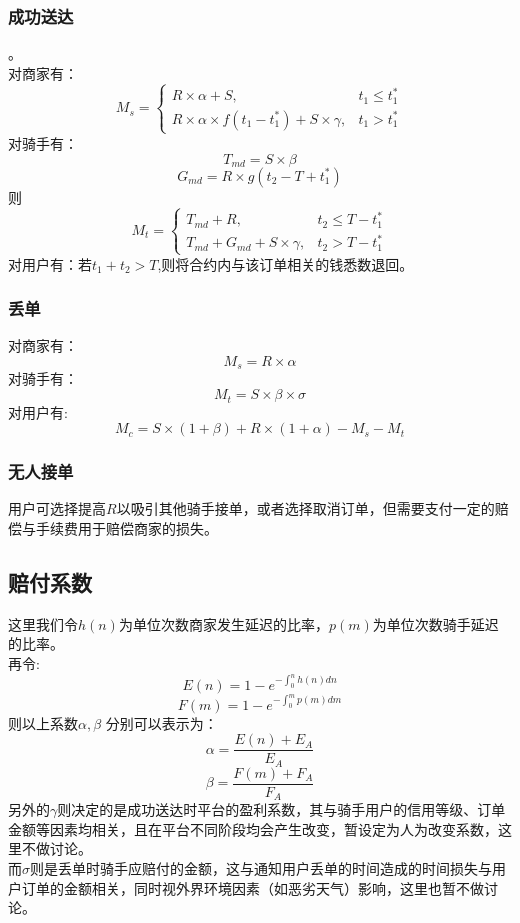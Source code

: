 \documentclass[UTF8]{ctexart}
\begin{document}
\begin{multicols}{2}
  \subsubsection{成功送达}
    。 \\
    \indent 对商家有：
    $$
    M_s=\left\{
      \begin{array}{lr}
        R \times \alpha + S,  & {t_1 \leq t_1^{*}}\\
        R \times \alpha \times f(t_1-t_1^{*}) + S \times \gamma, & {t_1 > t_1^{*}}
      \end{array}\right.
    $$
    \indent 对骑手有：\\
    $$T_{md} = S \times \beta $$
    $$ G_{md}=R \times g(t_2-T+t_1^{*})$$
    \indent 则
    $$
    M_t=\left\{
      \begin{array}{lr}
        T_{md}+R,  & {t_2 \leq T-t_1^{*}}\\
        T_{md} + G_{md} + S \times \gamma, & {t_2 > T -t_1^{*}}
      \end{array}\right.
    $$
    \indent 对用户有：若$t_1+t_2>T$,则将合约内与该订单相关的钱悉数退回。
  \subsubsection{丢单}

  \indent 对商家有：
  $$M_s=R \times \alpha $$
  \indent 对骑手有：
  $$M_t=S \times \beta \times \sigma$$
  \indent 对用户有:
  $$M_c=S \times (1+\beta)+R \times (1+\alpha)-M_s-M_t$$
  \subsubsection{无人接单}
  \indent 用户可选择提高$R$以吸引其他骑手接单，或者选择取消订单，但需要支付一定的赔偿与手续费用于赔偿商家的损失。
  \subsection{赔付系数}
  \indent 这里我们令$h(n)$为单位次数商家发生延迟的比率，$p(m)$为单位次数骑手延迟的比率。\\
  \indent 再令:$$E(n)=1-e^{- \int_{0}^{n}h(n)dn}$$
  $$F(m)=1-e^{- \int_{0}^{m}p(m)dm}$$
  \indent 则以上系数$\alpha, \beta$ 分别可以表示为：
  $$\alpha = \frac{E(n)+E_A}{E_A}$$
  $$\beta = \frac{F(m)+F_A}{F_A}$$
  \indent 另外的$\gamma$则决定的是成功送达时平台的盈利系数，其与骑手用户的信用等级、订单金额等因素均相关，且在平台不同阶段均会产生改变，暂设定为人为改变系数，这里不做讨论。\\
  \indent 而$\sigma$则是丢单时骑手应赔付的金额，这与通知用户丢单的时间造成的时间损失与用户订单的金额相关，同时视外界环境因素（如恶劣天气）影响，这里也暂不做讨论。


\end{multicols}
\end{document}
